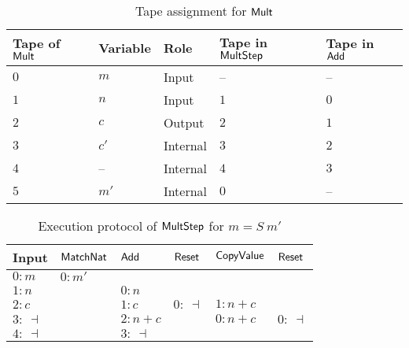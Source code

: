 \begin{table}[t]
  \centering
  \begin{tabular}{l|l|l|l|l}
    Tape of $\mathsf{Mult}$ & Variable & Role & Tape in $\mathsf{MultStep}$ & Tape in $\mathsf{Add}$ \\ \hline
    $0$ & $m$  & Input    & --  & --  \\
    $1$ & $n$  & Input    & $1$ & $0$ \\
    $2$ & $c$  & Output   & $2$ & $1$ \\
    $3$ & $c'$ & Internal & $3$ & $2$ \\
    $4$ & --   & Internal & $4$ & $3$ \\
    $5$ & $m'$ & Internal & $0$ & --  \\
  \end{tabular}
  \caption{Tape assignment for $\mathsf{Mult}$}
  \label{tab:tapes-Mult}
\end{table}
\begin{table}[t]
  \centering
  \begin{tabular}{l||l|l|l|l|l}
    Input       & $\mathsf{MatchNat}$ & $\mathsf{Add}$  & $\mathsf{Reset}$ & $\mathsf{CopyValue}$ & $\mathsf{Reset}$   \\ \hline
    $0: m$      & $0 : m'$        &             &              &                  &                \\
    $1: n$      &                 & $0: n$      &              &                  &                \\
    $2: c$      &                 & $1: c$      & $0:~\dashv$  & $1: n+c$         &                \\
    $3:~\dashv$ &                 & $2: n+c$    &              & $0: n+c$         & $0:~\dashv$    \\
    $4:~\dashv$ &                 & $3:~\dashv$ &              &                  &                \\
  \end{tabular}
  \caption{Execution protocol of $\mathsf{MultStep}$ for $m=S~m'$}
  \label{tab:exec-MultStep}
\end{table}

